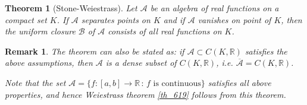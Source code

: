 \documentclass[10pt]{book}
\newtheorem{theorem}{Theorem}[chapter]
\newtheorem{remark}{Remark}[chapter]
\theoremstyle{definition}
\numberwithin{equation}{chapter}
\begin{document}
\begin{theorem}[Stone-Weiestrass]\label{th_623}
Let $\mathscr{A}$ be an algebra of real functions on a compact set $K$. If $\mathscr{A}$ separates points on $K$ and if $\mathscr{A}$ vanishes on point of $K$, then the uniform closure $\mathscr{B}$ of $\mathscr{A}$ consists of all real functions on $K$.
\end{theorem}
\begin{remark}
The theorem can also be stated as: if $\mathscr{A} \subset C(K,\mathbb{R})$ satisfies the above assumptions, then $\mathscr{A}$ is a dense subset of $C(K,\mathbb{R})$, i.e. $\overline{\mathscr{A}} = C(K,\mathbb{R})$.

Note that the set $\mathscr{A} = \{f: [a,b] \to \mathbb{R} \,:\, f \,\, \text{is continuous}\}$ satisfies all above properties, and hence Weiestrass theorem \ref{th_619} follows from this theorem.
\end{remark}
\end{document}
